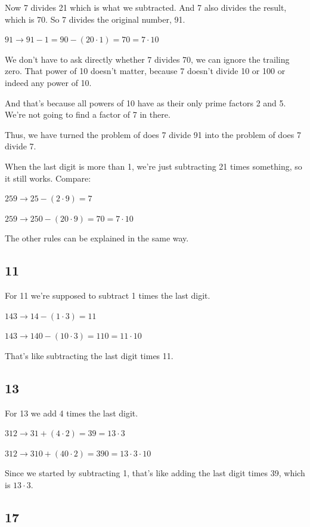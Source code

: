 \documentclass[11pt, oneside]{article}
\begin{document}
Now 7 divides 21 which is what we subtracted.  And 7 also divides the result, which is 70.  So 7 divides the original number, 91.

$91 \rightarrow 91 - 1 = 90 - (20 \cdot 1) = 70 = 7 \cdot 10$

We don't have to ask directly whether 7 divides 70, we can ignore the trailing zero.  That power of 10 doesn't matter, because 7 doesn't divide 10 or 100 or indeed any power of 10.  

And that's because all powers of 10 have as their only prime factors 2 and 5.  We're not going to find a factor of 7 in there.

Thus, we have turned the problem of does 7 divide 91 into the problem of does 7 divide 7.  

When the last digit is more than 1, we're just subtracting 21 times something, so it still works.  Compare:

$259 \rightarrow 25 - (2 \cdot 9) = 7$

$259 \rightarrow 250 - (20 \cdot 9) = 70 = 7 \cdot 10$

The other rules can be explained in the same way.  

\subsection*{11}

For 11 we're supposed to subtract 1 times the last digit.

$143 \rightarrow 14 - (1 \cdot 3) = 11$

$143 \rightarrow 140 - (10 \cdot 3) = 110 = 11 \cdot 10$

That's like subtracting the last digit times 11.

\subsection*{13}

For 13 we add 4 times the last digit.

$312 \rightarrow 31 + (4 \cdot 2) = 39 = 13 \cdot 3$

$312 \rightarrow 310 + (40 \cdot 2) = 390 = 13 \cdot 3 \cdot 10$

Since we started by subtracting 1, that's like adding the last digit times 39, which is $13 \cdot 3$.

\subsection*{17}
\end{document}
